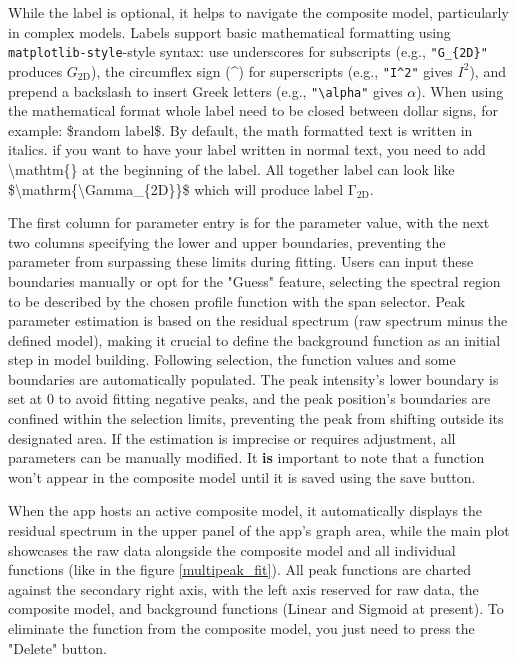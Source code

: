 \par
While the label is optional, it helps to navigate the composite model, particularly in complex models. Labels support basic mathematical formatting using \texttt{matplotlib-style}-style syntax: use underscores for subscripts (e.g., \texttt{"G\_\{2D\}"} produces $G_\mathrm{2D}$), the circumflex sign (\textasciicircum) for superscripts (e.g., \texttt{"I\textasciicircum 2"} gives $I^2$), and prepend a backslash to insert Greek letters (e.g., \texttt{"\textbackslash alpha"} gives $\alpha$). When using the mathematical format whole label need to be closed between dollar signs, for example: \$random label\$. By default, the math formatted text is written in italics. if you want to have your label written in normal text, you need to add \textbackslash mathtm\{\} at the beginning of the label. All together label can look like \$\textbackslash mathrm\{\textbackslash Gamma\_\{2D\}\}\$ which will produce label $\mathrm{\Gamma_{2D}}$.
\par
The first column for parameter entry is for the parameter value, with the next two columns specifying the lower and upper boundaries, preventing the parameter from surpassing these limits during fitting. Users can input these boundaries manually or opt for the "Guess" feature, selecting the spectral region to be described by the chosen profile function with the span selector. Peak parameter estimation is based on the residual spectrum (raw spectrum minus the defined model), making it crucial to define the background function as an initial step in model building. Following selection, the function values and some boundaries are automatically populated. The peak intensity's lower boundary is set at 0 to avoid fitting negative peaks, and the peak position's boundaries are confined within the selection limits, preventing the peak from shifting outside its designated area. If the estimation is imprecise or requires adjustment, all parameters can be manually modified. It \textbf{is} important to note that a function won't appear in the composite model until it is saved using the save button. 
\par
When the app hosts an active composite model, it automatically displays the residual spectrum in the upper panel of the app's graph area, while the main plot showcases the raw data alongside the composite model and all individual functions (like in the figure \ref{multipeak_fit}). All peak functions are charted against the secondary right axis, with the left axis reserved for raw data, the composite model, and background functions (Linear and Sigmoid at present). To eliminate the function from the composite model, you just need to press the "Delete" button.


